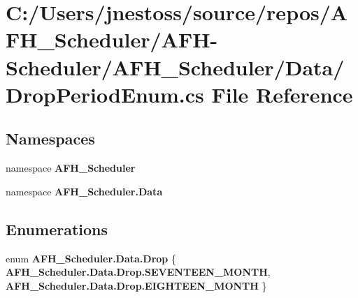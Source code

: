 \section{C\+:/\+Users/jnestoss/source/repos/\+A\+F\+H\+\_\+\+Scheduler/\+A\+F\+H-\/\+Scheduler/\+A\+F\+H\+\_\+\+Scheduler/\+Data/\+Drop\+Period\+Enum.cs File Reference}
\label{_drop_period_enum_8cs}
\subsection*{Namespaces}
\begin{DoxyCompactItemize}
\item 
namespace \textbf{ A\+F\+H\+\_\+\+Scheduler}
\item 
namespace \textbf{ A\+F\+H\+\_\+\+Scheduler.\+Data}
\end{DoxyCompactItemize}
\subsection*{Enumerations}
\begin{DoxyCompactItemize}
\item 
enum \textbf{ A\+F\+H\+\_\+\+Scheduler.\+Data.\+Drop} \{ \textbf{ A\+F\+H\+\_\+\+Scheduler.\+Data.\+Drop.\+S\+E\+V\+E\+N\+T\+E\+E\+N\+\_\+\+M\+O\+N\+TH}, 
\textbf{ A\+F\+H\+\_\+\+Scheduler.\+Data.\+Drop.\+E\+I\+G\+H\+T\+E\+E\+N\+\_\+\+M\+O\+N\+TH}
 \}
\end{DoxyCompactItemize}
